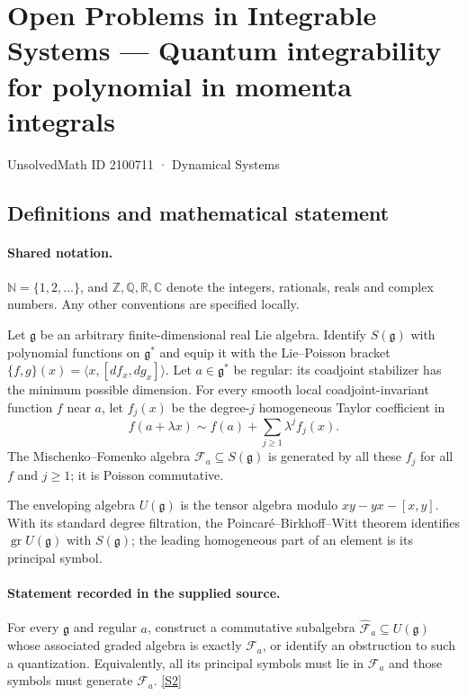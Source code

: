 \documentclass[11pt]{article}
\newcommand{\sref}[2]{\hyperlink{source:#1:#2}{[S#2]}}
\begin{document}
\setcounter{section}{2100710}
\section{Open Problems in Integrable Systems — Quantum integrability for polynomial in momenta integrals}\label{2100711}
{\small\sffamily UnsolvedMath ID 2100711 · Dynamical Systems}
\subsection{Definitions and mathematical statement}

\paragraph{Shared notation.}$\mathbb N=\{1,2,\ldots\}$, and $\mathbb Z,\mathbb Q,\mathbb R,\mathbb C$ denote the integers, rationals, reals and complex numbers. Any other conventions are specified locally.


Let $\mathfrak g$ be an arbitrary finite-dimensional real Lie algebra. Identify $S(\mathfrak g)$ with polynomial functions on $\mathfrak g^*$ and equip it with the Lie--Poisson bracket $\{f,g\}(x)=\langle x,[df_x,dg_x]\rangle$. Let $a\in\mathfrak g^*$ be regular: its coadjoint stabilizer has the minimum possible dimension. For every smooth local coadjoint-invariant function $f$ near $a$, let $f_j(x)$ be the degree-$j$ homogeneous Taylor coefficient in
\[ f(a+\lambda x)\sim f(a)+\sum_{j\geq1}\lambda^j f_j(x). \]
The Mischenko--Fomenko algebra $\mathcal F_a\subseteq S(\mathfrak g)$ is generated by all these $f_j$ for all $f$ and $j\geq1$; it is Poisson commutative.\par The enveloping algebra $U(\mathfrak g)$ is the tensor algebra modulo $xy-yx-[x,y]$. With its standard degree filtration, the Poincaré--Birkhoff--Witt theorem identifies $\operatorname{gr}U(\mathfrak g)$ with $S(\mathfrak g)$; the leading homogeneous part of an element is its principal symbol.
\paragraph{Statement recorded in the supplied source.}
For every $\mathfrak g$ and regular $a$, construct a commutative subalgebra $\widehat{\mathcal F}_a\subseteq U(\mathfrak g)$ whose associated graded algebra is exactly $\mathcal F_a$, or identify an obstruction to such a quantization. Equivalently, all its principal symbols must lie in $\mathcal F_a$ and those symbols must generate $\mathcal F_a$. \sref{2100711}{2}
\end{document}
